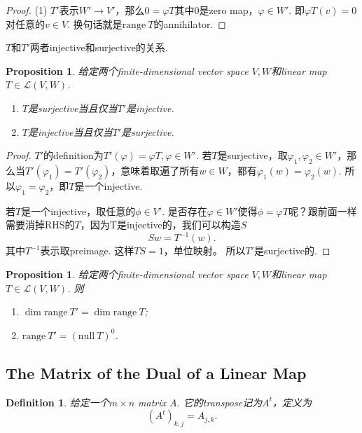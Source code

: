 \documentclass{article}
\newtheorem{proposition}[theorem]{Proposition}
\newtheorem{definition}[theorem]{Definition}
\newcommand\nul[1]{\text{null}\ #1}
\newcommand\range[1]{\text{range}\ #1}
\begin{document}
\begin{proof}
(1) $T'$表示$W' \rightarrow V'$，那么$0 = \varphi T$其中$0$是zero map，$\varphi  \in W'$. 即$\varphi T(v) = 0$对任意的$v \in V$. 换句话就是$\range T$的annihilator.
\end{proof}

{\color{red} $T$和$T'$两者injective和surjective的关系}.

\begin{proposition}
\rm 给定两个finite-dimensional vector space $V,W$和linear map $T \in \mathcal{L}(V,W)$.

\begin{enumerate}
	\item $T$是surjective当且仅当$T'$是injective.
	\item $T$是injective当且仅当$T'$是surjective.
\end{enumerate}
\end{proposition}

\begin{proof}
$T'$的definition为$T'(\varphi) = \varphi T,\varphi \in W'$. 若$T$是surjective，取$\varphi_1,\varphi_2 \in W'$，那么当$T'(\varphi_1) = T'(\varphi_2)$，意味着取遍了所有$w \in W$，都有$\varphi_1(w)=\varphi_2(w)$. 所以$\varphi_1 = \varphi_2$，即$T$是一个injective.

若$T$是一个injective，取任意的$\phi \in V'$. 是否存在$\varphi \in W'$使得$\phi = \varphi T$呢？跟前面一样需要消掉RHS的$T$，因为T是injective的，我们可以构造$S$
$$
Sw= T^{-1}(w).
$$
其中$T^{-1}$表示取preimage. 这样$TS = 1$，单位映射。 所以$T'$是surjective的.
\end{proof}

\begin{proposition}\label{dual-map: range-space}
\rm 给定两个finite-dimensional vector space $V,W$和linear map $T \in \mathcal{L}(V,W)$. 则
\begin{enumerate}
	\item $\dim \range{T'} = \dim \range{T}$;
	\item $\range{T'} = (\nul{T})^0$.
\end{enumerate}
\end{proposition}


\newpage
\subsection{The Matrix of the Dual of a Linear Map}
\begin{definition}
\rm 给定一个$m \times n$ matrix $A$. 它的transpose记为$A^{t}$，定义为
$$
(A^t)_{k,j} = A_{j,k}.
$$
\end{definition}
\end{document}
